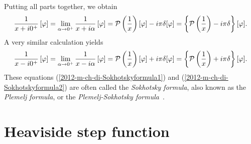 Putting all parts together, we obtain
\begin{equation}
\frac{1}{x+i0^+} \left[ \varphi \right]
= \lim_{\alpha  \rightarrow 0^+}\frac{1}{x+i\alpha} \left[ \varphi \right]
=  {\cal P} \left(\frac{1}{x}\right) \left[\varphi\right]
-i \pi \delta [\varphi ] = \left\{
{\cal P} \left(\frac{1}{x}\right) -i \pi \delta
\right\}  [\varphi ].
\label{2012-m-ch-di-Sokhotskyformula1}
\end{equation}
A very similar calculation yields
\begin{equation}
\frac{1}{x-i0^+} \left[ \varphi \right]
=
\lim_{\alpha  \rightarrow 0^+}\frac{1}{x-i\alpha} \left[ \varphi \right]
=  {\cal P} \left(\frac{1}{x}\right) \left[\varphi\right]
+i \pi \delta [\varphi ] = \left\{
{\cal P} \left(\frac{1}{x}\right) +i \pi \delta
\right\}  [\varphi ].
\label{2012-m-ch-di-Sokhotskyformula2}
\end{equation}
These equations
(\ref{2012-m-ch-di-Sokhotskyformula1})
and
(\ref{2012-m-ch-di-Sokhotskyformula2})
are often called the
{\em Sokhotsky  formula}, also known as the {\em Plemelj  formula}, or the {\em Plemelj-Sokhotsky formula}~\cite[-20mm]{Sokhotski-1873,Plemelj1908}.





\section{Heaviside step function}


